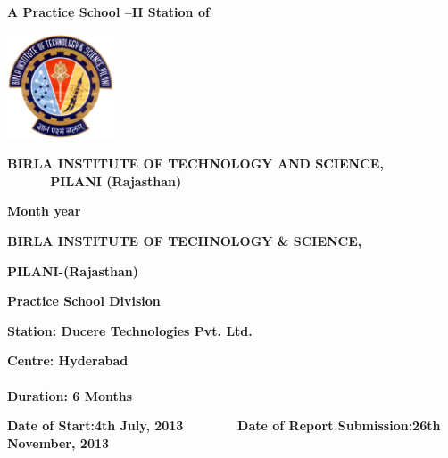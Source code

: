 {\centering{}\bfseries
A Practice School --II Station of
\par}


\bigskip

{\centering 
\includegraphics[width=3.175cm,height=3.124cm]{formatreport-img2.jpg}
\par}


\bigskip


\bigskip

{\centering{}\bfseries
BIRLA INSTITUTE OF TECHNOLOGY AND SCIENCE, \ \ \ \ \ \ PILANI
(Rajasthan)
\par}

{\centering{}\bfseries
Month year
\par}


\bigskip


\bigskip


\bigskip


\bigskip

{\centering{}\bfseries
BIRLA INSTITUTE OF TECHNOLOGY \& SCIENCE,
\par}

{\centering{}\bfseries
PILANI-(Rajasthan)
\par}

\newpage
\bigskip

{\centering{}\bfseries
Practice School Division
\par}


\bigskip


\bigskip

{\bfseries
Station: Ducere Technologies Pvt. Ltd. }

{
\textbf{Centre: Hyderabad
\ \ \ \ \ }\ \ \ \ \ \ \ \ \ \ \ \ \ \ \ \ \ \ \ \ \ \ \ \ \ \ \ \ \ \ \ \ \ \ \ \ \ \ \ \ \ \ \ \ \ \ \ \ \ \ \ \ \ \ \ \ \ \ \ \ \ \ \ \ \ \textbf{Duration: 6 Months
}\ }

{
\textbf{Date of Start}\textbf{:4th July, 2013} \ \ \ \  \ \ \ \ \textbf{Date of Report
Submission:26th November, 2013}}


